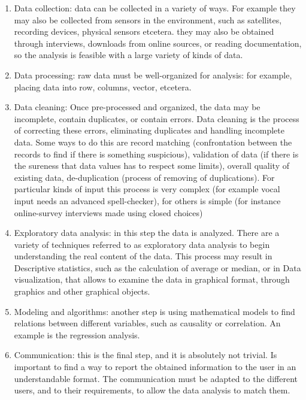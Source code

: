 \begin{enumerate}

\item Data collection: data can be collected in a variety of ways. For example they may also be collected from sensors in the environment, such as satellites, recording devices, physical sensors etcetera. they may also be obtained through interviews, downloads from online sources, or reading documentation, so the analysis is feasible with a large variety of kinds of data. 

\item Data processing: raw data must be well-organized for analysis: for example, placing data into row, columns, vector, etcetera.

\item Data cleaning: Once pre-processed and organized, the data may be incomplete, contain duplicates, or contain errors. Data cleaning is the process of correcting these errors, eliminating duplicates and handling incomplete data. Some ways to do this are record matching (confrontation between the records to find if there is something suspicious), validation of data (if there is the sureness that data values has to respect some limits), overall quality of existing data, de-duplication (process of removing of duplications). For particular kinds of input this process is very complex (for example vocal input needs an advanced spell-checker), for others is simple (for instance online-survey interviews made using closed choices) 

\item Exploratory data analysis: in this step the data is analyzed. There are a variety of techniques referred to as exploratory data analysis to begin understanding the real content of the data. This process may result in Descriptive statistics, such as the calculation of average or median, or in Data visualization, that allows to examine the data in graphical format, through graphics and other graphical objects.

\item Modeling and algorithms: another step is using mathematical models to find relations between different variables, such as causality or correlation. An example is the regression analysis.

\item Communication: this is the final step, and it is absolutely not trivial. Is important to find a way to report the obtained information to the user in an understandable format. The communication must be adapted to the different users,  and to their requirements, to allow the data analysis to match them. 

\end{enumerate}

